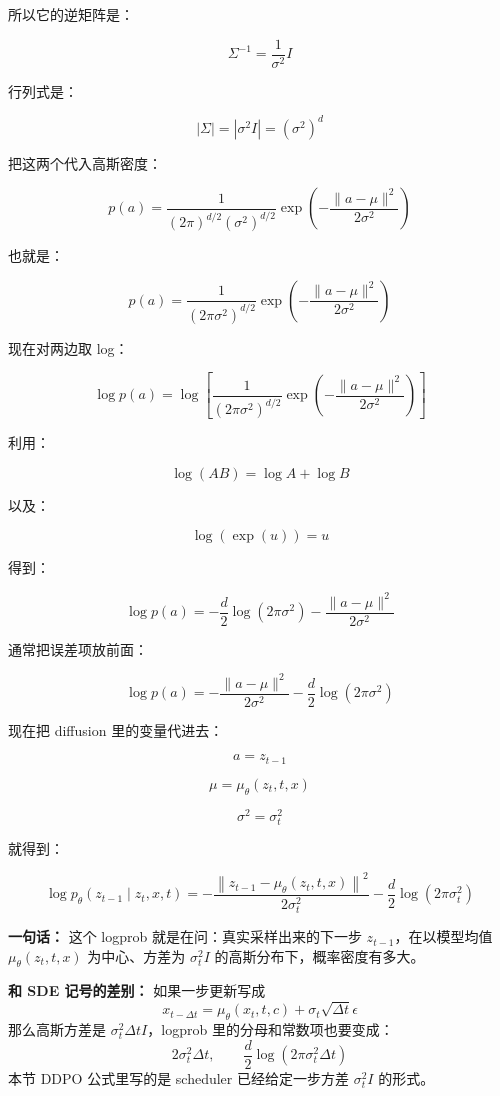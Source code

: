 所以它的逆矩阵是：

\[
\Sigma^{-1}
=
\frac{1}{\sigma^2}I
\]

行列式是：

\[
|\Sigma|
=
|\sigma^2 I|
=
(\sigma^2)^d
\]

把这两个代入高斯密度：

\[
p(a)
=
\frac{1}
{(2\pi)^{d/2}(\sigma^2)^{d/2}}
\exp
\left(
-
\frac{\|a-\mu\|^2}{2\sigma^2}
\right)
\]

也就是：

\[
p(a)
=
\frac{1}
{(2\pi\sigma^2)^{d/2}}
\exp
\left(
-
\frac{\|a-\mu\|^2}{2\sigma^2}
\right)
\]

现在对两边取 log：

\[
\log p(a)
=
\log
\left[
\frac{1}
{(2\pi\sigma^2)^{d/2}}
\exp
\left(
-
\frac{\|a-\mu\|^2}{2\sigma^2}
\right)
\right]
\]

利用：

\[
\log(AB)=\log A+\log B
\]

以及：

\[
\log(\exp(u))=u
\]

得到：

\[
\log p(a)
=
-
\frac{d}{2}\log(2\pi\sigma^2)
-
\frac{\|a-\mu\|^2}{2\sigma^2}
\]

通常把误差项放前面：

\[
\log p(a)
=
-
\frac{\|a-\mu\|^2}{2\sigma^2}
-
\frac{d}{2}\log(2\pi\sigma^2)
\]

现在把 diffusion 里的变量代进去：

\[
a=z_{t-1}
\]

\[
\mu=\mu_\theta(z_t,t,x)
\]

\[
\sigma^2=\sigma_t^2
\]

就得到：

\[
\log
p_\theta(z_{t-1}\mid z_t,x,t)
=
-
\frac{
\left\|
z_{t-1}
-
\mu_\theta(z_t,t,x)
\right\|^2
}{
2\sigma_t^2
}
-
\frac{d}{2}\log(2\pi\sigma_t^2)
\]

\begin{summarybox}
\textbf{一句话：} 这个 logprob 就是在问：真实采样出来的下一步 $z_{t-1}$，在以模型均值 $\mu_\theta(z_t,t,x)$ 为中心、方差为 $\sigma_t^2 I$ 的高斯分布下，概率密度有多大。
\end{summarybox}

\begin{warnbox}
\textbf{和 SDE 记号的差别：} 如果一步更新写成
\[
x_{t-\Delta t}
=
\mu_\theta(x_t,t,c)
+
\sigma_t\sqrt{\Delta t}\epsilon
\]
那么高斯方差是 $\sigma_t^2\Delta t I$，logprob 里的分母和常数项也要变成：
\[
2\sigma_t^2\Delta t,
\qquad
\frac{d}{2}\log(2\pi\sigma_t^2\Delta t)
\]
本节 DDPO 公式里写的是 scheduler 已经给定一步方差 $\sigma_t^2 I$ 的形式。
\end{warnbox}

